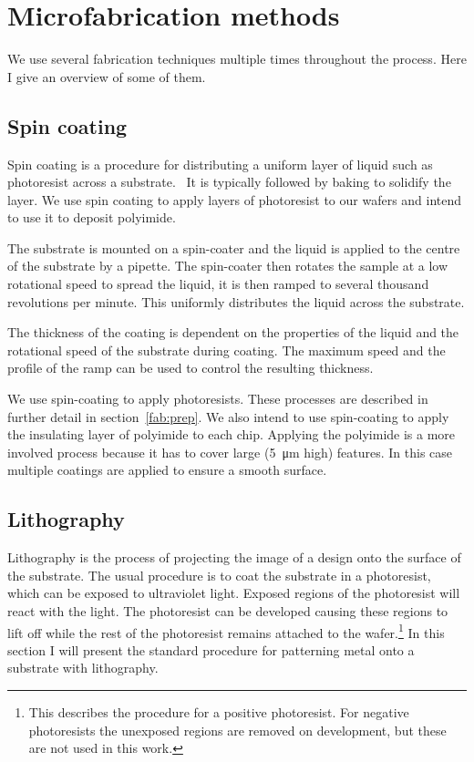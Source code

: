 \section{Microfabrication methods}

We use several fabrication techniques multiple times throughout the process.
Here I give an overview of some of them.

\subsection{Spin coating}
\label{fab:spin}

Spin coating is a procedure for distributing a uniform layer of liquid such as
photoresist  across a substrate.~\cite{Cohen2011} It is typically followed by
baking to solidify the layer. We use spin coating to apply layers of
photoresist to our wafers and intend to use it to deposit polyimide.

The substrate is mounted on a spin-coater
%
%
and the liquid is applied to the centre of the substrate by a pipette. The
spin-coater then rotates the sample at a low rotational speed to spread the
liquid, it is then ramped to several thousand revolutions per minute.
This uniformly distributes the liquid across the substrate.

The thickness of the coating is dependent on the properties of the liquid
 and the rotational speed of the substrate during coating.
The maximum speed and the profile of the ramp can be used to control the
resulting thickness.

We use spin-coating to apply photoresists. These processes are described in
further detail in section~\ref{fab:prep}. We also intend to use spin-coating
to apply the insulating layer of polyimide to each chip. Applying the
polyimide is a more involved process because it has to cover large
(\SI{5}{\micro\meter} high) features. In this case multiple coatings are
applied to ensure a smooth surface. 

\subsection{Lithography}

Lithography is the process of projecting the image of a design onto the surface
of the substrate. The usual procedure is to coat the substrate in a
photoresist, which can be exposed to ultraviolet light. Exposed regions of the
photoresist will react with the light. The photoresist can be developed causing
these regions to lift off while the rest of the photoresist remains attached to
the wafer.\footnote{This describes the procedure for a positive photoresist.
For negative photoresists the unexposed regions are removed on development, but
these are not used in this work.} In this section I will present the standard
procedure for patterning metal onto a substrate with
lithography.~\cite{Madou2002}

